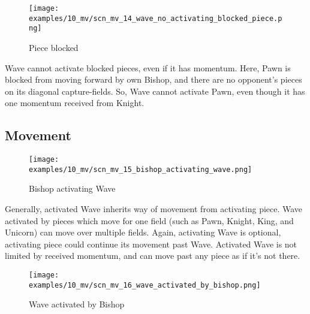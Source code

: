 \vspace*{-1.4\baselineskip}
\noindent
\begin{figure}[h]
\texttt{[image: examples/10\_mv/scn\_mv\_14\_wave\_no\_activating\_blocked\_piece.png]}
\caption{Piece blocked}
\label{fig:scn_mv_14_wave_no_activating_blocked_piece}
\end{figure}

Wave cannot activate blocked pieces, even if it has momentum. Here, Pawn is blocked
from moving forward by own Bishop, and there are no opponent's pieces on its
diagonal capture-fields. So, Wave cannot activate Pawn, even though it has one
momentum received from Knight.

\clearpage %

\subsection*{Movement}
\label{sec:Miranda's veil/Wave/Movement}

\vspace*{-1.4\baselineskip}
\noindent
\begin{figure}[h]
\texttt{[image: examples/10\_mv/scn\_mv\_15\_bishop\_activating\_wave.png]}
\caption{Bishop activating Wave}
\label{fig:scn_mv_15_bishop_activating_wave}
\end{figure}

Generally, activated Wave inherits way of movement from activating piece. Wave activated
by pieces which move for one field (such as Pawn, Knight, King, and Unicorn) can move
over multiple fields. Again, activating Wave is optional, activating piece could continue
its movement past Wave. Activated Wave is not limited by received momentum, and can move
past any piece as if it's not there.

\clearpage %

\vspace*{-2.1\baselineskip}
\noindent
\begin{figure}[!h]
\texttt{[image: examples/10\_mv/scn\_mv\_16\_wave\_activated\_by\_bishop.png]}
\caption{Wave activated by Bishop}
\label{fig:scn_mv_16_wave_activated_by_bishop}
\end{figure}

